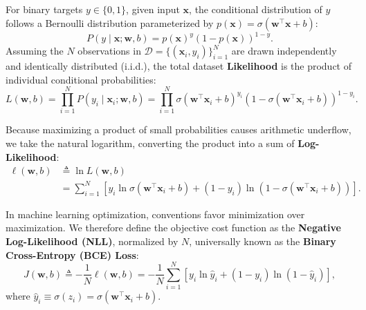 For binary targets $y \in \{0, 1\}$, given input $\mathbf{x}$, the conditional distribution of $y$ follows a Bernoulli distribution parameterized by $p(\mathbf{x}) = \sigma(\mathbf{w}^\top \mathbf{x} + b)$:
\begin{equation}
P(y \mid \mathbf{x}; \mathbf{w}, b) = p(\mathbf{x})^y (1 - p(\mathbf{x}))^{1 - y}.
\label{eq:bernoulli_pmf}
\end{equation}
Assuming the $N$ observations in $\mathcal{D} = \{(\mathbf{x}_i, y_i)\}_{i=1}^N$ are drawn independently and identically distributed (i.i.d.), the total dataset \textbf{Likelihood} is the product of individual conditional probabilities:
\begin{equation}
L(\mathbf{w}, b) = \prod_{i=1}^N P(y_i \mid \mathbf{x}_i; \mathbf{w}, b) = \prod_{i=1}^N \sigma(\mathbf{w}^\top \mathbf{x}_i + b)^{y_i} \left( 1 - \sigma(\mathbf{w}^\top \mathbf{x}_i + b) \right)^{1 - y_i}.
\label{eq:dataset_likelihood}
\end{equation}

Because maximizing a product of small probabilities causes arithmetic underflow, we take the natural logarithm, converting the product into a sum of \textbf{Log-Likelihood}:
\begin{align}
\ell(\mathbf{w}, b) &\triangleq \ln L(\mathbf{w}, b) \nonumber \\
&= \sum_{i=1}^N \left[ y_i \ln \sigma(\mathbf{w}^\top \mathbf{x}_i + b) + (1 - y_i) \ln\left(1 - \sigma(\mathbf{w}^\top \mathbf{x}_i + b)\right) \right].
\label{eq:dataset_log_likelihood}
\end{align}

In machine learning optimization, conventions favor minimization over maximization. We therefore define the objective cost function as the \textbf{Negative Log-Likelihood (NLL)}, normalized by $N$, universally known as the \textbf{Binary Cross-Entropy (BCE) Loss}:
\begin{equation}
J(\mathbf{w}, b) \triangleq -\frac{1}{N} \ell(\mathbf{w}, b) = -\frac{1}{N} \sum_{i=1}^N \left[ y_i \ln \hat{y}_i + (1 - y_i) \ln(1 - \hat{y}_i) \right],
\label{eq:binary_cross_entropy_cost}
\end{equation}
where $\hat{y}_i \equiv \sigma(z_i) = \sigma(\mathbf{w}^\top \mathbf{x}_i + b)$.

